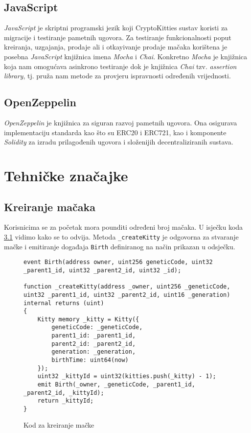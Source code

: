 \documentclass[times, utf8, tehnicka_dokumentacija]{fer}
\begin{document}
\section{JavaScript}
{\it JavaScript} je skriptni programski jezik koji CryptoKitties sustav koristi za migracije i testiranje pametnih ugovora. Za testiranje funkcionalnosti poput kreiranja, uzgajanja, prodaje ali i otkayivanje prodaje mačaka korištena je posebna {\it JavaScript} knjižnica imena {\it Mocha} i {\it Chai}. Konkretno {\it Mocha} je knjižnica koja nam omogućava asinkrono testiranje dok je knjižnica {\it Chai} tzv. {\it assertion library}, tj. pruža nam metode za provjeru ispravnosti određenih vrijednosti.

\section{OpenZeppelin} 
{\it OpenZeppelin} je knjižnica za siguran razvoj pametnih ugovora. Ona osigurava implementaciju standarda kao što su ERC20 i ERC721, kao i komponente {\it Solidity} za izradu prilagođenih ugovora i složenijih decentraliziranih sustava.

\chapter{Tehničke značajke}

\section{Kreiranje mačaka}
Korisnicima se za početak mora pounditi određeni broj mačaka. U isječku koda \ref{lst:createkitty} vidimo kako se to odvija. Metoda \lstinline|_createKitty| je odgovorna za stvaranje mačke i emitiranje događaja \lstinline|Birth| definiranog na način prikazan u odsječku.

\begin{figure}
\begin{lstlisting}
event Birth(address owner, uint256 geneticCode, uint32 _parent1_id, uint32 _parent2_id, uint32 _id);

function _createKitty(address _owner, uint256 _geneticCode, uint32 _parent1_id, uint32 _parent2_id, uint16 _generation) internal returns (uint)
{
    Kitty memory _kitty = Kitty({
        geneticCode: _geneticCode,
        parent1_id: _parent1_id,
        parent2_id: _parent2_id,
        generation: _generation,
        birthTime: uint64(now)
    });
    uint32 _kittyId = uint32(kitties.push(_kitty) - 1);
    emit Birth(_owner, _geneticCode, _parent1_id, _parent2_id, _kittyId);
    return _kittyId;
}
\end{lstlisting}
\caption{Kod za kreiranje mačke}
\label{lst:createkitty}
\end{figure}
\end{document}
